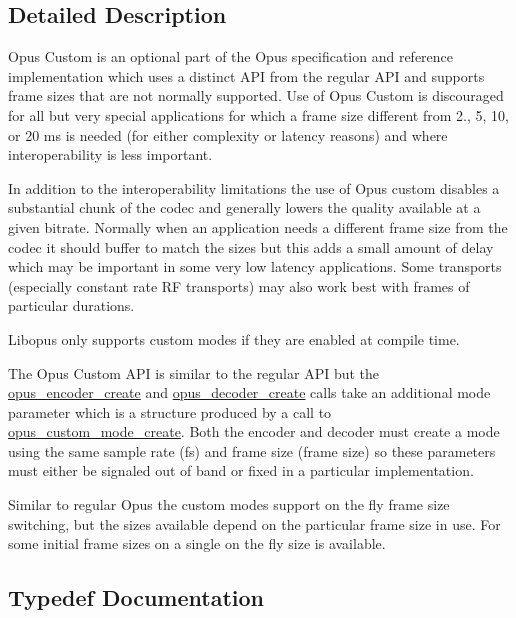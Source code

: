 \subsection{Detailed Description}
Opus Custom is an optional part of the Opus specification and reference implementation which uses a distinct A\+PI from the regular A\+PI and supports frame sizes that are not normally supported. Use of Opus Custom is discouraged for all but very special applications for which a frame size different from 2., 5, 10, or 20 ms is needed (for either complexity or latency reasons) and where interoperability is less important. 

In addition to the interoperability limitations the use of Opus custom disables a substantial chunk of the codec and generally lowers the quality available at a given bitrate. Normally when an application needs a different frame size from the codec it should buffer to match the sizes but this adds a small amount of delay which may be important in some very low latency applications. Some transports (especially constant rate RF transports) may also work best with frames of particular durations.

Libopus only supports custom modes if they are enabled at compile time.

The Opus Custom A\+PI is similar to the regular A\+PI but the \hyperlink{group__opus__encoder_gaa89264fd93c9da70362a0c9b96b9ca88}{opus\+\_\+encoder\+\_\+create} and \hyperlink{group__opus__decoder_ga753f6fe0b699c81cfd47d70c8e15a0bd}{opus\+\_\+decoder\+\_\+create} calls take an additional mode parameter which is a structure produced by a call to \hyperlink{group__opus__custom_ga8d6683d0b9f2990a8f54d8bafe4f4027}{opus\+\_\+custom\+\_\+mode\+\_\+create}. Both the encoder and decoder must create a mode using the same sample rate (fs) and frame size (frame size) so these parameters must either be signaled out of band or fixed in a particular implementation.

Similar to regular Opus the custom modes support on the fly frame size switching, but the sizes available depend on the particular frame size in use. For some initial frame sizes on a single on the fly size is available. 

\subsection{Typedef Documentation}
\mbox{\label{group__opus__custom_gacae60f89c5ce7aeea69503451b9e2e6f}} 
